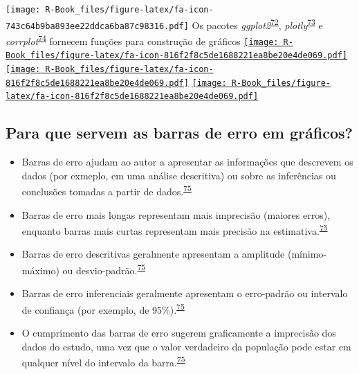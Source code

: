 \documentclass[
]{book}
\begin{document}
\texttt{[image: R-Book\_files/figure-latex/fa-icon-743c64b9ba893ee22ddca6ba87c98316.pdf]} Os pacotes \emph{ggplot2}\textsuperscript{\protect\hyperlink{ref-ggplot2}{72}}, \emph{plotly}\textsuperscript{\protect\hyperlink{ref-plotly}{73}} e \emph{corrplot}\textsuperscript{\protect\hyperlink{ref-corrplot}{74}} fornecem funções para construção de gráficos \href{https://cran.r-project.org/web/packages/ggplot2/index.html}{\texttt{[image: R-Book\_files/figure-latex/fa-icon-816f2f8c5de1688221ea8be20e4de069.pdf]}} \href{https://cran.r-project.org/web/packages/plotly/index.html}{\texttt{[image: R-Book\_files/figure-latex/fa-icon-816f2f8c5de1688221ea8be20e4de069.pdf]}} \href{https://cran.r-project.org/web/packages/corrplot/index.html}{\texttt{[image: R-Book\_files/figure-latex/fa-icon-816f2f8c5de1688221ea8be20e4de069.pdf]}}

\hypertarget{para-que-servem-as-barras-de-erro-em-gruxe1ficos}{%
\subsection{Para que servem as barras de erro em gráficos?}\label{para-que-servem-as-barras-de-erro-em-gruxe1ficos}}

\begin{itemize}
\item
  Barras de erro ajudam ao autor a apresentar as informações que descrevem os dados (por exmeplo, em uma análise descritiva) ou sobre as inferências ou conclusões tomadas a partir de dados.\textsuperscript{\protect\hyperlink{ref-Cumming2007}{75}}
\item
  Barras de erro mais longas representam mais imprecisão (maiores erros), enquanto barras mais curtas representam mais precisão na estimativa.\textsuperscript{\protect\hyperlink{ref-Cumming2007}{75}}
\item
  Barras de erro descritivas geralmente apresentam a amplitude (mínimo-máximo) ou desvio-padrão.\textsuperscript{\protect\hyperlink{ref-Cumming2007}{75}}
\item
  Barras de erro inferenciais geralmente apresentam o erro-padrão ou intervalo de confiança (por exemplo, de 95\%).\textsuperscript{\protect\hyperlink{ref-Cumming2007}{75}}
\item
  O cumprimento das barras de erro sugerem graficamente a imprecisão dos dados do estudo, uma vez que o valor verdadeiro da população pode estar em qualquer nível do intervalo da barra.\textsuperscript{\protect\hyperlink{ref-Cumming2007}{75}}
\end{itemize}
\end{document}
